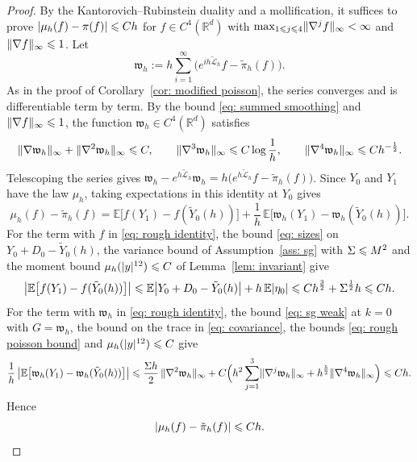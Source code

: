 \begin{proof}
    By the Kantorovich--Rubinstein duality and a mollification, it suffices to prove $|\mu_h(f) - \pi(f)| \leqslant C h$ for $f \in C^4(\mathbb R^d)$ with $\max_{1 \leqslant j \leqslant 4} \lVert \nabla^j f \rVert_\infty < \infty$ and $\lVert \nabla f \rVert_\infty \leqslant 1$. Let
    \begin{equation*}
        \mathfrak w_h := h \sum_{i=1}^{\infty} \bigl( e^{ih\tilde{\mathcal L}_h} f - \tilde\pi_h(f) \bigr) .
    \end{equation*}
    As in the proof of Corollary~\ref{cor: modified poisson}, the series converges and is differentiable term by term. By the bound \eqref{eq: summed smoothing} and $\lVert \nabla f \rVert_\infty \leqslant 1$, the function $\mathfrak w_h \in C^4(\mathbb R^d)$ satisfies
    \begin{equation}
        \lVert \nabla \mathfrak w_h \rVert_\infty + \lVert \nabla^2 \mathfrak w_h \rVert_\infty \leqslant C , \qquad \lVert \nabla^3 \mathfrak w_h \rVert_\infty \leqslant C \log\frac1h , \qquad \lVert \nabla^4 \mathfrak w_h \rVert_\infty \leqslant C h^{-\frac12} .
        \label{eq: rough poisson bound}
    \end{equation}
    Telescoping the series gives $\mathfrak w_h - e^{h\tilde{\mathcal L}_h} \mathfrak w_h = h \bigl( e^{h\tilde{\mathcal L}_h} f - \tilde\pi_h(f) \bigr)$. Since $Y_0$ and $Y_1$ have the law $\mu_h$, taking expectations in this identity at $Y_0$ gives
    \begin{equation}
        \mu_h(f) - \tilde\pi_h(f) = \mathbb E\bigl[ f(Y_1) - f(\tilde Y_0(h)) \bigr] + \frac1h\, \mathbb E\bigl[ \mathfrak w_h(Y_1) - \mathfrak w_h(\tilde Y_0(h)) \bigr] .
        \label{eq: rough identity}
    \end{equation}
    For the term with $f$ in \eqref{eq: rough identity}, the bound \eqref{eq: sizes} on $Y_0 + D_0 - \tilde Y_0(h)$, the variance bound of Assumption~\ref{ass: sg} with $\Sigma \leqslant M^2$ and the moment bound $\mu_h(|y|^{12}) \leqslant C$ of Lemma~\ref{lem: invariant} give
    \begin{equation*}
        \bigl| \mathbb E\bigl[ f(Y_1) - f(\tilde Y_0(h)) \bigr] \bigr| \leqslant \mathbb E \bigl| Y_0 + D_0 - \tilde Y_0(h) \bigr| + h\, \mathbb E |\eta_0| \leqslant C h^{\frac32} + \Sigma^{\frac12} h \leqslant C h .
    \end{equation*}
    For the term with $\mathfrak w_h$ in \eqref{eq: rough identity}, the bound \eqref{eq: sg weak} at $k = 0$ with $G = \mathfrak w_h$, the bound on the trace in \eqref{eq: covariance}, the bounds \eqref{eq: rough poisson bound} and $\mu_h(|y|^{12}) \leqslant C$ give
    \begin{equation*}
        \frac1h\, \bigl| \mathbb E\bigl[ \mathfrak w_h(Y_1) - \mathfrak w_h(\tilde Y_0(h)) \bigr] \bigr| \leqslant \frac{\Sigma h}{2}\, \lVert \nabla^2 \mathfrak w_h \rVert_\infty + C \Bigl( h^2 \sum_{j=1}^{3} \lVert \nabla^j \mathfrak w_h \rVert_\infty + h^{\frac52} \lVert \nabla^4 \mathfrak w_h \rVert_\infty \Bigr) \leqslant C h .
    \end{equation*}
    Hence
    \begin{equation}
        |\mu_h(f) - \tilde\pi_h(f)| \leqslant C h .
        \label{eq: rough modified}
    \end{equation}


\end{proof}
